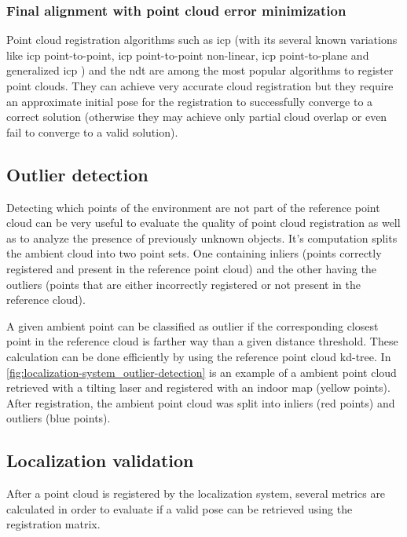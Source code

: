 \subsubsection{Final alignment with point cloud error minimization}

Point cloud registration algorithms such as \gls{icp} \cite{Besl1992} (with its several known variations \cite{Rusinkiewicz2001,Pomerleau2013} like \gls{icp} point-to-point, \gls{icp} point-to-point non-linear, \gls{icp} point-to-plane and generalized \gls{icp} \cite{Segal2009}) and the \gls{ndt} \cite{Magnusson2009} are among the most popular algorithms to register point clouds. They can achieve very accurate cloud registration but they require an approximate initial pose for the registration to successfully converge to a correct solution (otherwise they may achieve only partial cloud overlap or even fail to converge to a valid solution).


\subsection{Outlier detection}

Detecting which points of the environment are not part of the reference point cloud can be very useful to evaluate the quality of point cloud registration as well as to analyze the presence of previously unknown objects. It's computation splits the ambient cloud into two point sets. One containing inliers (points correctly registered and present in the reference point cloud) and the other having the outliers (points that are either incorrectly registered or not present in the reference cloud).

A given ambient point can be classified as outlier if the corresponding closest point in the reference cloud is farther way than a given distance threshold. These calculation can be done efficiently by using the reference point cloud kd-tree. In \cref{fig:localization-system_outlier-detection} is an example of a ambient point cloud retrieved with a tilting laser and registered with an indoor map (yellow points). After registration, the ambient point cloud was split into inliers (red points) and outliers (blue points).


\subsection{Localization validation}

After a point cloud is registered by the localization system, several metrics are calculated in order to evaluate if a valid pose can be retrieved using the registration matrix.

